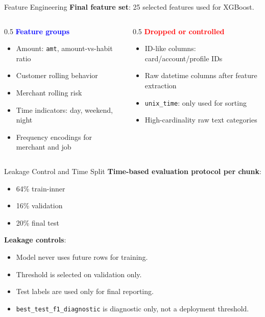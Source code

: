 \documentclass{beamer}
\begin{document}
\begin{frame}{Feature Engineering}
    \textbf{Final feature set}: 25 selected features used for XGBoost.

    \vspace{0.35cm}
    \begin{columns}
        \begin{column}{0.5\textwidth}
            \textbf{\textcolor{blue}{Feature groups}}
            \begin{itemize}
                \item Amount: \texttt{amt}, amount-vs-habit ratio
                \item Customer rolling behavior
                \item Merchant rolling risk
                \item Time indicators: day, weekend, night
                \item Frequency encodings for merchant and job
            \end{itemize}
        \end{column}
        \begin{column}{0.5\textwidth}
            \textbf{\textcolor{red}{Dropped or controlled}}
            \begin{itemize}
                \item ID-like columns: card/account/profile IDs
                \item Raw datetime columns after feature extraction
                \item \texttt{unix\_time}: only used for sorting
                \item High-cardinality raw text categories
            \end{itemize}
        \end{column}
    \end{columns}
\end{frame}

\begin{frame}{Leakage Control and Time Split}
    \textbf{Time-based evaluation protocol per chunk}:
    \begin{itemize}
        \item 64\% train-inner
        \item 16\% validation
        \item 20\% final test
    \end{itemize}

    \vspace{0.35cm}
    \textbf{Leakage controls}:
    \begin{itemize}
        \item Model never uses future rows for training.
        \item Threshold is selected on validation only.
        \item Test labels are used only for final reporting.
        \item \texttt{best\_test\_f1\_diagnostic} is diagnostic only, not a deployment threshold.
    \end{itemize}
\end{frame}
\end{document}
